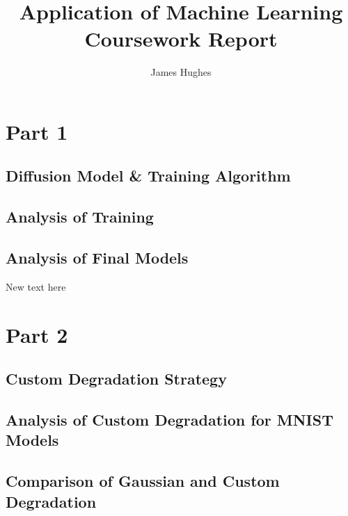 \documentclass[12pt]{article}
\title{Application of Machine Learning Coursework Report}
\author{James Hughes}
\begin{document}
\maketitle
\newpage

\section*{Part 1}
\subsection*{Diffusion Model \& Training Algorithm}
\subsection*{Analysis of Training}
\subsection*{Analysis of Final Models}
New text here

\section*{Part 2}
\subsection*{Custom Degradation Strategy}
\subsection*{Analysis of Custom Degradation for MNIST Models}
\subsection*{Comparison of Gaussian and Custom Degradation}
\end{document}
